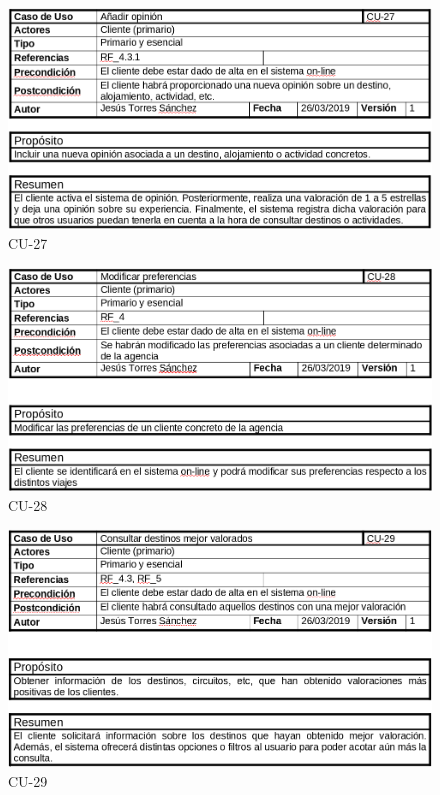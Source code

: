 \documentclass{article}
\begin{document}
	\begin{figure}[H]
		\centering
		\includegraphics[totalheight=8cm]{cu-27}
		\caption{CU-27}
		\label{fig:cu-27}
	\end{figure}

	\begin{figure}[H]
		\centering
		\includegraphics[totalheight=8cm]{cu-28}
		\caption{CU-28}
		\label{fig:cu-28}
	\end{figure}
	
	\begin{figure}[H]
		\centering
		\includegraphics[totalheight=8cm]{cu-29}
		\caption{CU-29}
		\label{fig:cu-29}
	\end{figure}
\end{document}
